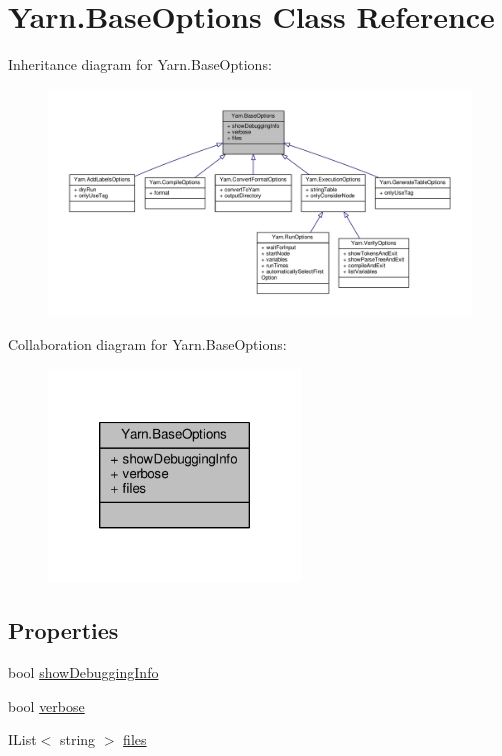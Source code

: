 \hypertarget{a00042}{\section{Yarn.\-Base\-Options Class Reference}
\label{a00042}
}


Inheritance diagram for Yarn.\-Base\-Options\-:
\nopagebreak
\begin{figure}[H]
\begin{center}
\leavevmode
\includegraphics[width=350pt]{a00645}
\end{center}
\end{figure}


Collaboration diagram for Yarn.\-Base\-Options\-:
\nopagebreak
\begin{figure}[H]
\begin{center}
\leavevmode
\includegraphics[width=190pt]{a00646}
\end{center}
\end{figure}
\subsection*{Properties}
\begin{DoxyCompactItemize}
\item 
bool \hyperlink{a00042_a89964ea17bd19caf00cb5bff563ed01c}{show\-Debugging\-Info}
\item 
bool \hyperlink{a00042_ada4d83d1756918f362d55f6649b82b17}{verbose}
\item 
I\-List$<$ string $>$ \hyperlink{a00042_aa93cbb1bc1d5328e0a417012621e92d2}{files}
\end{DoxyCompactItemize}


